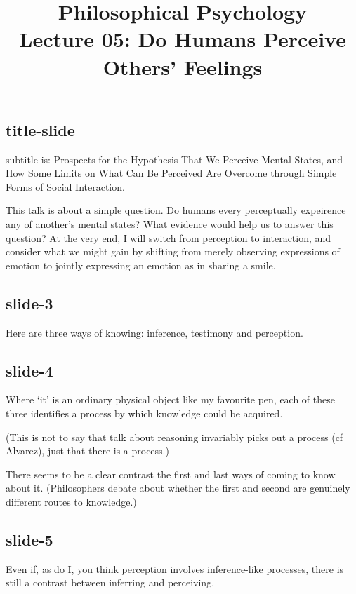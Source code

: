 \documentclass[12pt,\papersize]{extarticle}
\begin{document}
\setlength\footnotesep{1em}







\title {Philosophical Psychology \\ Lecture 05: Do Humans Perceive Others’ Feelings}



\maketitle

\subsection{title-slide}
subtitle is:
Prospects for the Hypothesis That We Perceive Mental States,
and How Some Limits on What Can Be Perceived Are Overcome through Simple Forms of Social Interaction.

This talk is about a simple question.
Do humans every perceptually expeirence any of another’s mental states?
What evidence would help us to answer this question?
At the very end, I will switch from perception to interaction,
and consider what we might gain by
shifting from merely observing expressions of emotion to
jointly expressing an emotion as in sharing a smile.

\subsection{slide-3}
Here are three ways of knowing: inference, testimony and perception.

\subsection{slide-4}
Where ‘it’ is an ordinary physical object like my favourite pen,
each of these three identifies a process by which knowledge could be acquired.

(This is not to say that talk about reasoning invariably picks out a process (cf Alvarez),
just that there is a process.)

There seems to be a clear contrast the first and last ways of coming to know about it.
(Philosophers debate about whether the first and second are genuinely different routes
to knowledge.)

\subsection{slide-5}
Even if, as do I, you think perception involves inference-like processes, there is still
a contrast between inferring and perceiving.
\end{document}

